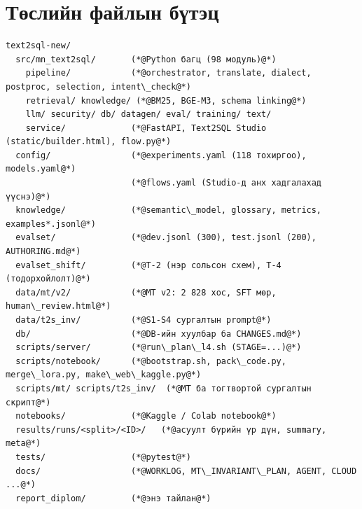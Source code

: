 
\chapter{Төслийн файлын бүтэц}
\label{app:files}

\begin{lstlisting}[language={}, basicstyle=\ttfamily\scriptsize, numbers=none]
text2sql-new/
  src/mn_text2sql/       (*@Python багц (98 модуль)@*)
    pipeline/            (*@orchestrator, translate, dialect, postproc, selection, intent\_check@*)
    retrieval/ knowledge/ (*@BM25, BGE-M3, schema linking@*)
    llm/ security/ db/ datagen/ eval/ training/ text/
    service/             (*@FastAPI, Text2SQL Studio (static/builder.html), flow.py@*)
  config/                (*@experiments.yaml (118 тохиргоо), models.yaml@*)
                         (*@flows.yaml (Studio-д анх хадгалахад үүснэ)@*)
  knowledge/             (*@semantic\_model, glossary, metrics, examples*.jsonl@*)
  evalset/               (*@dev.jsonl (300), test.jsonl (200), AUTHORING.md@*)
  evalset_shift/         (*@T-2 (нэр сольсон схем), T-4 (тодорхойлолт)@*)
  data/mt/v2/            (*@MT v2: 2 828 хос, SFT мөр, human\_review.html@*)
  data/t2s_inv/          (*@S1-S4 сургалтын prompt@*)
  db/                    (*@DB-ийн хуулбар ба CHANGES.md@*)
  scripts/server/        (*@run\_plan\_l4.sh (STAGE=...)@*)
  scripts/notebook/      (*@bootstrap.sh, pack\_code.py, merge\_lora.py, make\_web\_kaggle.py@*)
  scripts/mt/ scripts/t2s_inv/  (*@MT ба тогтвортой сургалтын скрипт@*)
  notebooks/             (*@Kaggle / Colab notebook@*)
  results/runs/<split>/<ID>/   (*@асуулт бүрийн үр дүн, summary, meta@*)
  tests/                 (*@pytest@*)
  docs/                  (*@WORKLOG, MT\_INVARIANT\_PLAN, AGENT, CLOUD ...@*)
  report_diplom/         (*@энэ тайлан@*)
\end{lstlisting}
